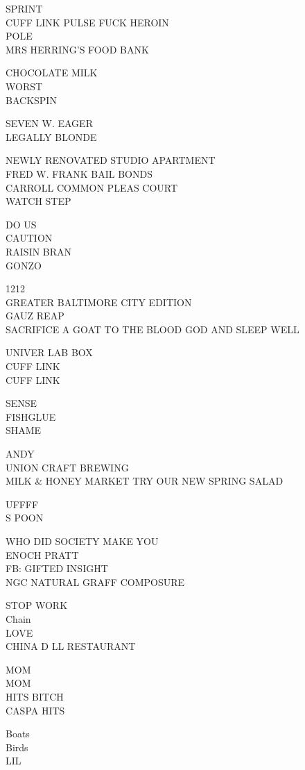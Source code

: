 \documentclass[10pt,letterpaper]{article}
\begin{document}
SPRINT\\
CUFF LINK PULSE FUCK HEROIN\\
POLE\\
MRS HERRING'S FOOD BANK

CHOCOLATE MILK\\
WORST\\
BACKSPIN

SEVEN W. EAGER\\
LEGALLY BLONDE

NEWLY RENOVATED STUDIO APARTMENT\\
FRED W. FRANK BAIL BONDS\\
CARROLL COMMON PLEAS COURT\\
WATCH STEP

DO US\\
CAUTION\\
RAISIN BRAN\\
GONZO

1212\\
GREATER BALTIMORE CITY EDITION\\
GAUZ REAP\\
SACRIFICE A GOAT TO THE BLOOD GOD AND SLEEP WELL

UNIVER LAB BOX\\
CUFF LINK\\
CUFF LINK

SENSE\\
FISHGLUE\\
SHAME

ANDY\\
UNION CRAFT BREWING\\
MILK \& HONEY MARKET TRY OUR NEW SPRING SALAD

UFFFF\\
S POON

WHO DID SOCIETY MAKE YOU\\
ENOCH PRATT\\
FB: GIFTED INSIGHT\\
NGC NATURAL GRAFF COMPOSURE

STOP WORK\\
Chain\\
LOVE\\
CHINA D LL RESTAURANT

MOM\\
MOM\\
HITS BITCH\\
CASPA HITS

Boats\\
Birds\\
LIL
\end{document}
